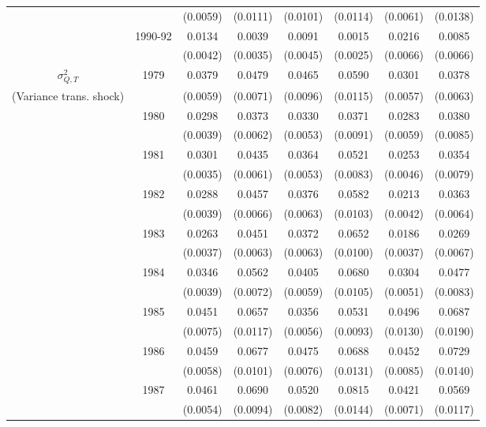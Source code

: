 \begin{table}
\begin{center}
{\begin{tabular}{cccc|cc|cc}
\\  &                    & (0.0059) & (0.0111)  & (0.0101) & (0.0114)  & (0.0061) & (0.0138) 
\\  & 1990-92 & 0.0134 &   0.0039 & 0.0091 &   0.0015 & 0.0216 &   0.0085 
\\  &         & (0.0042) & (0.0035) & (0.0045) & (0.0025) & (0.0066) & (0.0066) 
\\ \hline  
 $\sigma^2_{Q,T}$ & 1979      & 0.0379 &   0.0479 & 0.0465 &   0.0590 & 0.0301 &   0.0378 
\\ (Variance trans. shock) &     & (0.0059) & (0.0071) & (0.0096) & (0.0115) & (0.0057) & (0.0063) 
\\  & 1980 & 0.0298 &   0.0373 & 0.0330 &   0.0371 & 0.0283 &   0.0380
\\  &                    & (0.0039) & (0.0062)  & (0.0053) & (0.0091)  & (0.0059) & (0.0085) 
\\  & 1981 & 0.0301 &   0.0435 & 0.0364 &   0.0521 & 0.0253 &   0.0354
\\  &                    & (0.0035) & (0.0061)  & (0.0053) & (0.0083)  & (0.0046) & (0.0079) 
\\  & 1982 & 0.0288 &   0.0457 & 0.0376 &   0.0582 & 0.0213 &   0.0363
\\  &                    & (0.0039) & (0.0066)  & (0.0063) & (0.0103)  & (0.0042) & (0.0064) 
\\  & 1983 & 0.0263 &   0.0451 & 0.0372 &   0.0652 & 0.0186 &   0.0269
\\  &                    & (0.0037) & (0.0063)  & (0.0063) & (0.0100)  & (0.0037) & (0.0067) 
\\  & 1984 & 0.0346 &   0.0562 & 0.0405 &   0.0680 & 0.0304 &   0.0477
\\  &                    & (0.0039) & (0.0072)  & (0.0059) & (0.0105)  & (0.0051) & (0.0083) 
\\  & 1985 & 0.0451 &   0.0657 & 0.0356 &   0.0531 & 0.0496 &   0.0687
\\  &                    & (0.0075) & (0.0117)  & (0.0056) & (0.0093)  & (0.0130) & (0.0190) 
\\  & 1986 & 0.0459 &   0.0677 & 0.0475 &   0.0688 & 0.0452 &   0.0729
\\  &                    & (0.0058) & (0.0101)  & (0.0076) & (0.0131)  & (0.0085) & (0.0140) 
\\  & 1987 & 0.0461 &   0.0690 & 0.0520 &   0.0815 & 0.0421 &   0.0569
\\  &                    & (0.0054) & (0.0094)  & (0.0082) & (0.0144)  & (0.0071) & (0.0117) 

\end{tabular}}
\end{center}
\end{table}
